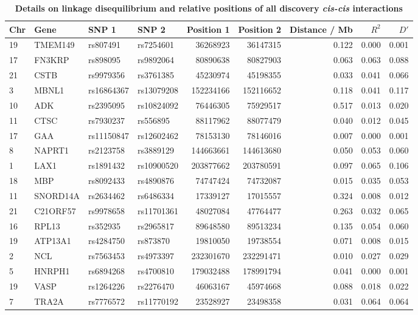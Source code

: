 \documentclass{article}
\begin{document}
\begin{table}[ht]
{\footnotesize
\begin{threeparttable}
\caption{\textbf{Details on linkage disequilibrium and relative positions of all discovery \emph{cis-cis} interactions}}
\label{tab:ld}
\begin{tabular}{llllrrrrr}
\hline
Chr & Gene & SNP 1 & SNP 2 & Position 1 & Position 2 & Distance / Mb & $R^2$ & $D'$ \\
\hline
19 & TMEM149 & rs807491 & rs7254601 & 36268923 & 36147315 & 0.122 & 0.000 & 0.001 \\
17 & FN3KRP & rs898095 & rs9892064 & 80890638 & 80827903 & 0.063 & 0.063 & 0.088 \\
21 & CSTB & rs9979356 & rs3761385 & 45230974 & 45198355 & 0.033 & 0.041 & 0.066 \\
3 & MBNL1 & rs16864367 & rs13079208 & 152234166 & 152116652 & 0.118 & 0.041 & 0.117 \\
10 & ADK & rs2395095 & rs10824092 & 76446305 & 75929517 & 0.517 & 0.013 & 0.020 \\
11 & CTSC & rs7930237 & rs556895 & 88117962 & 88077479 & 0.040 & 0.012 & 0.045 \\
17 & GAA & rs11150847 & rs12602462 & 78153130 & 78146016 & 0.007 & 0.000 & 0.001 \\
8 & NAPRT1 & rs2123758 & rs3889129 & 144663661 & 144613680 & 0.050 & 0.053 & 0.060 \\
1 & LAX1 & rs1891432 & rs10900520 & 203877662 & 203780591 & 0.097 & 0.065 & 0.106 \\
18 & MBP & rs8092433 & rs4890876 & 74747424 & 74732087 & 0.015 & 0.035 & 0.053 \\
11 & SNORD14A & rs2634462 & rs6486334 & 17339127 & 17015557 & 0.324 & 0.008 & 0.012 \\
21 & C21ORF57 & rs9978658 & rs11701361 & 48027084 & 47764477 & 0.263 & 0.032 & 0.065 \\
16 & RPL13 & rs352935 & rs2965817 & 89648580 & 89513234 & 0.135 & 0.054 & 0.060 \\
19 & ATP13A1 & rs4284750 & rs873870 & 19810050 & 19738554 & 0.071 & 0.008 & 0.015 \\
2 & NCL & rs7563453 & rs4973397 & 232301670 & 232291471 & 0.010 & 0.027 & 0.029 \\
5 & HNRPH1 & rs6894268 & rs4700810 & 179032488 & 178991794 & 0.041 & 0.000 & 0.001 \\
19 & VASP & rs1264226 & rs2276470 & 46063167 & 45974668 & 0.088 & 0.018 & 0.022 \\
7 & TRA2A & rs7776572 & rs11770192 & 23528927 & 23498358 & 0.031 & 0.064 & 0.064 \\

\end{tabular}
\end{threeparttable}}
\end{table}
\end{document}
